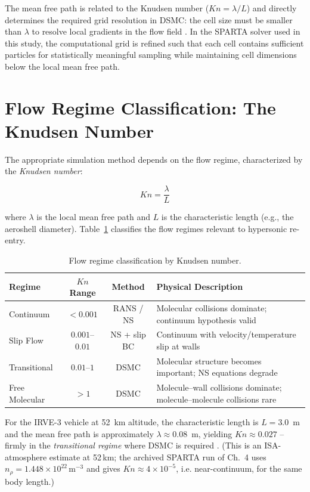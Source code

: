 \noindent The mean free path is related to the Knudsen number ($Kn = \lambda / L$) and directly determines the required grid resolution in DSMC: the cell size must be smaller than $\lambda$ to resolve local gradients in the flow field \cite{bird1994molecular}. In the SPARTA solver used in this study, the computational grid is refined such that each cell contains sufficient particles for statistically meaningful sampling while maintaining cell dimensions below the local mean free path.

\section{Flow Regime Classification: The Knudsen Number}

The appropriate simulation method depends on the flow regime, characterized by the \textit{Knudsen number}:

\begin{equation}
    Kn = \frac{\lambda}{L}
    \label{eq:knudsen_definition}
\end{equation}

\noindent where $\lambda$ is the local mean free path and $L$ is the characteristic length (e.g., the aeroshell diameter). Table~\ref{tab:knudsen_regimes} classifies the flow regimes relevant to hypersonic re-entry.

\begin{table}[H]
    \centering
    \caption{Flow regime classification by Knudsen number.}
    \label{tab:knudsen_regimes}
    \begin{tabular}{|l|c|c|p{4.5cm}|}
    \hline
    \textbf{Regime} & \textbf{$Kn$ Range} & \textbf{Method} & \textbf{Physical Description} \\ \hline
    Continuum & $< 0.001$ & RANS / NS & Molecular collisions dominate; continuum hypothesis valid \\ \hline
    Slip Flow & $0.001$--$0.01$ & NS + slip BC & Continuum with velocity/temperature slip at walls \\ \hline
    Transitional & $0.01$--$1$ & DSMC & Molecular structure becomes important; NS equations degrade \\ \hline
    Free Molecular & $> 1$ & DSMC & Molecule--wall collisions dominate; molecule--molecule collisions rare \\ \hline
    \end{tabular}
\end{table}

\noindent For the IRVE-3 vehicle at 52~km altitude, the characteristic length is $L = 3.0$~m and the mean free path is approximately $\lambda \approx 0.08$~m, yielding $Kn \approx 0.027$ -- firmly in the \textit{transitional regime} where DSMC is required \cite{bird1994molecular}. (This is an ISA-atmosphere estimate at 52\,km; the archived SPARTA run of Ch.~4 uses $n_{\rho}=1.448\times10^{22}$\,m$^{-3}$ and gives $Kn\approx4\times10^{-5}$, i.e. near-continuum, for the same body length.)

